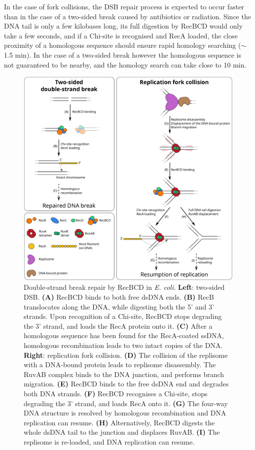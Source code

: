 In the case of fork collisions, the DSB repair process is expected to occur faster than in the case of a two-sided break caused by antibiotics or radiation. Since the DNA tail is only a few kilobases long, its full digestion by RecBCD would only take a few seconds, and if a Chi-site is recognised and RecA loaded, the close proximity of a homologous sequence should ensure rapid homology searching ($\sim$1.5 min)\cite{Amarh2018}. In the case of a two-sided break however the homologous sequence is not guaranteed to be nearby, and the homology search can take close to 10 min\cite{Wiktor2021}.

\begin{figure}[htbp]
    \centering
    \includegraphics[width=.8\textwidth]{Figures/DSB_scheme.pdf}
    \caption{Double-strand break repair by RecBCD in \emph{E. coli}. \textbf{Left}: two-sided DSB. \textbf{(A)} RecBCD binds to both free dsDNA ends. \textbf{(B)} RecB translocates along the DNA, while digesting both the 5' and 3' strands. Upon recognition of a Chi-site, RecBCD stops degrading the 3' strand, and loads the RecA protein onto it. \textbf{(C)} After a homologous sequence has been found for the RecA-coated ssDNA, homologous recombination leads to two intact copies of the DNA. \textbf{Right}: replication fork collision. \textbf{(D)} The collision of the replisome with a DNA-bound protein leads to replisome disassembly. The RuvAB complex binds to the DNA junction, and performs branch migration. \textbf{(E)} RecBCD binds to the free dsDNA end and degrades both DNA strands. \textbf{(F)} RecBCD recognises a Chi-site, stops degrading the 3' strand, and loads RecA onto it. \textbf{(G)} The four-way DNA structure is resolved by homologous recombination and DNA replication can resume. \textbf{(H)} Alternatively, RecBCD digests the whole dsDNA tail to the junction and displaces RuvAB. \textbf{(I)} The replisome is re-loaded, and DNA replication can resume.}
    \label{Fig:DSB_scheme}
\end{figure}

